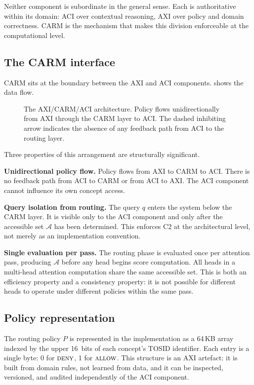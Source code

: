 \documentclass[11pt,a4paper]{article}
\theoremstyle{definition}
\newcommand{\ALLOW}{\mbox{\textsc{allow}}}
\newcommand{\DENY}{\mbox{\textsc{deny}}}
\newcommand{\acc}{\mathcal{A}}
\newcommand{\policy}{P}
\begin{document}
Neither component is subordinate in the general sense. Each is authoritative within
its domain: ACI over contextual reasoning, AXI over policy and domain correctness.
CARM is the mechanism that makes this division enforceable at the computational
level.

\subsection{The CARM interface}
\label{sec:interface}

CARM sits at the boundary between the AXI and ACI components.
 shows the data flow.

\begin{figure}[h]
\centering

\caption{The AXI/CARM/ACI architecture. Policy flows unidirectionally from AXI
through the CARM layer to ACI\@. The dashed inhibiting arrow indicates the absence
of any feedback path from ACI to the routing layer.}
\label{fig:architecture}
\end{figure}

Three properties of this arrangement are structurally significant.

\textbf{Unidirectional policy flow.} Policy flows from AXI to CARM to ACI\@. There
is no feedback path from ACI to CARM or from ACI to AXI\@. The ACI component cannot
influence its own concept access.

\textbf{Query isolation from routing.} The query $q$ enters the system below the
CARM layer. It is visible only to the ACI component and only after the accessible
set $\acc$ has been determined. This enforces C2 at the architectural level, not
merely as an implementation convention.

\textbf{Single evaluation per pass.} The routing phase is evaluated once per
attention pass, producing $\acc$ before any head begins score computation. All heads
in a multi-head attention computation share the same accessible set. This is both an
efficiency property and a consistency property: it is not possible for different
heads to operate under different policies within the same pass.

\subsection{Policy representation}

The routing policy $\policy$ is represented in the implementation as a 64\,KB array
indexed by the upper 16~bits of each concept's TOSID identifier. Each entry is a
single byte: 0 for $\DENY$, 1 for $\ALLOW$. This structure is an AXI artefact: it
is built from domain rules, not learned from data, and it can be inspected,
versioned, and audited independently of the ACI component.
\end{document}

